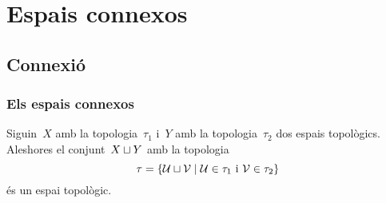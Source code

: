 \documentclass[../topologia.tex]{subfiles}
\begin{document}
\chapter{Espais connexos}
\section{Connexió}
    \subsection{Els espais connexos}
    \begin{proposition}
        \label{prop:topologia-a-la-unio-disjunta}
        Siguin~\(X\) amb la topologia~\(\tau_{1}\) i~\(Y\) amb la topologia~\(\tau_{2}\) dos espais topològics.
        Aleshores el conjunt~\(X\mathbin{\sqcup} Y\) amb la topologia
        \begin{equation}
            \label{prop:topologia-a-la-unio-disjunta:eq1}
            \tau=\{\mathcal{U}\mathbin{\sqcup}\mathcal{V}\mid\mathcal{U}\in\tau_{1}\text{ i }\mathcal{V}\in\tau_{2}\}
        \end{equation}
        és un espai topològic.
    \end{proposition}
\end{document}
